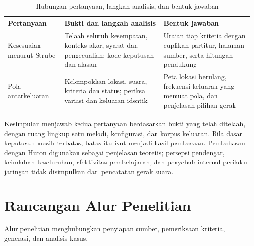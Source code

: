 \begin{table}[htbp]
\centering\footnotesize
\begin{tabularx}{\textwidth}{|>{\raggedright\arraybackslash}p{2.1cm}|>{\raggedright\arraybackslash}X|>{\raggedright\arraybackslash}X|}
\hline
\textbf{Pertanyaan} & \textbf{Bukti dan langkah analisis} & \textbf{Bentuk jawaban} \\ \hline
Kesesuaian menurut Strube & Telaah seluruh kesempatan, konteks akor, syarat dan pengecualian; kode keputusan dan alasan & Uraian tiap kriteria dengan cuplikan partitur, halaman sumber, serta hitungan pendukung \\ \hline
Pola antarkeluaran & Kelompokkan lokasi, suara, kriteria dan status; periksa variasi dan keluaran identik & Peta lokasi berulang, frekuensi keluaran yang memuat pola, dan penjelasan pilihan gerak \\ \hline
\end{tabularx}
\caption{Hubungan pertanyaan, langkah analisis, dan bentuk jawaban}
\label{tab:alur-analisis}
\end{table}

Kesimpulan menjawab kedua pertanyaan berdasarkan bukti yang telah ditelaah, dengan ruang lingkup satu melodi, konfigurasi, dan korpus keluaran. Bila dasar keputusan masih terbatas, batas itu ikut menjadi hasil pembacaan. Pembahasan dengan Huron digunakan sebagai penjelasan teoretis; persepsi pendengar, keindahan keseluruhan, efektivitas pembelajaran, dan penyebab internal perilaku jaringan tidak disimpulkan dari pencatatan gerak suara.

\section{Rancangan Alur Penelitian}\label{sec:rancangan-alur-penelitian}

Alur penelitian menghubungkan penyiapan sumber, pemeriksaan kriteria, generasi, dan analisis kasus.

